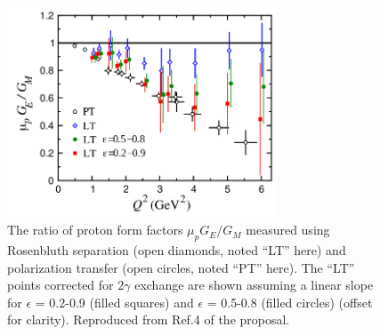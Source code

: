 \documentclass[11pt]{article}
\begin{document}
\begin{figure}[!h]
  \begin{center}
    \includegraphics[width=8cm]{Fig5_ref4.pdf}
    \caption{The ratio of proton form factors $\mu_p G_E/G_M$ measured using Rosenbluth separation %
      (open diamonds, noted ``LT'' here) 
      and polarization transfer %
      (open circles, noted ``PT'' here). The ``LT'' points corrected for 2$\gamma$ exchange are
shown assuming a linear slope for $\epsilon$ = 0.2-0.9 (filled squares) and $\epsilon$ = 0.5-0.8 (filled circles)
(offset for clarity).
Reproduced from Ref.4 of the proposal.
    }
    \label{fig5ref4}
  \end{center}
\end{figure}
%



%
%
%
%
%
    
\end{document}
